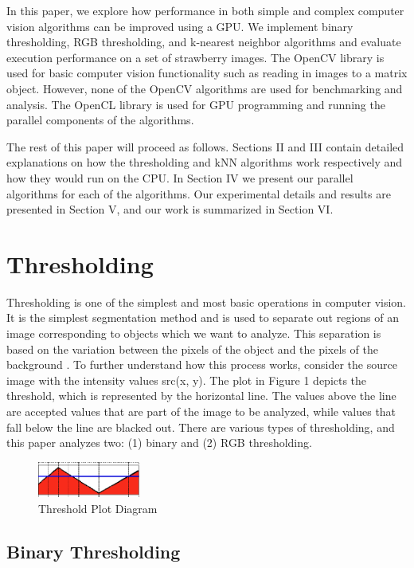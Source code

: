 \documentclass[conference]{IEEEtran}
\begin{document}
In this paper, we explore how performance in both simple and complex computer vision algorithms can be improved using a GPU. We implement
binary thresholding, RGB thresholding, and k-nearest neighbor algorithms and evaluate execution performance on a set of strawberry images. 
The OpenCV library is used for basic computer vision functionality such as reading in images to a matrix object. 
However, none of the OpenCV algorithms are used for benchmarking and analysis.
The OpenCL library is used for GPU programming and running the parallel components of the algorithms. 

The rest of this paper will proceed as follows. Sections II and III 
contain detailed explanations on how the thresholding and kNN algorithms work respectively and how they would run on the CPU.
In Section IV we present our parallel algorithms for each of the algorithms. Our experimental details and results are presented in Section V, and our work is summarized
in Section VI.

\section{Thresholding}
Thresholding is one of the simplest and most basic operations in computer vision. It is the simplest segmentation method
and is used to separate out regions of an image corresponding to objects which we want to analyze.
This separation is based on the variation between the pixels of the object and the pixels of the background \cite{Thresh}. 
To further understand how this process works, consider the source image with the intensity values src(x, y). The plot
in Figure 1 depicts the threshold, which is represented by the horizontal line. The values above the line are accepted values
that are part of the image to be analyzed, while values that fall below the line are blacked out.
There are various types of thresholding, and this paper analyzes two: (1) binary and (2) RGB thresholding.
\begin{figure}[h]
\centering
\includegraphics[width=0.3\textwidth]{ThreshDiag}
\caption{Threshold Plot Diagram}
\end{figure}

\subsection{Binary Thresholding}
\end{document}
